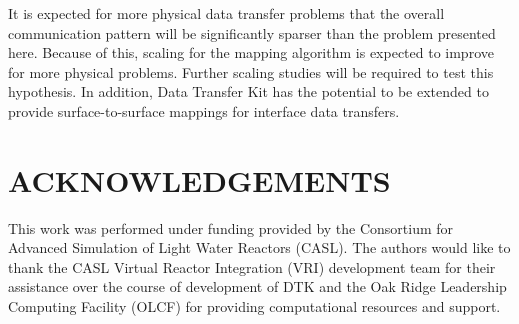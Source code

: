 \documentclass{mc2013}
\begin{document}
It is expected for more physical data transfer problems that the
overall communication pattern will be significantly sparser than the
problem presented here. Because of this, scaling for the mapping
algorithm is expected to improve for more physical problems. Further
scaling studies will be required to test this hypothesis. In addition,
Data Transfer Kit has the potential to be extended to provide
surface-to-surface mappings for interface data transfers.


\section*{ACKNOWLEDGEMENTS}

This work was performed under funding provided by the Consortium for
Advanced Simulation of Light Water Reactors (CASL). The authors would
like to thank the CASL Virtual Reactor Integration (VRI) development
team for their assistance over the course of development of DTK and
the Oak Ridge Leadership Computing Facility (OLCF) for providing
computational resources and support.

\setlength{\baselineskip}{12pt}


\end{document}
